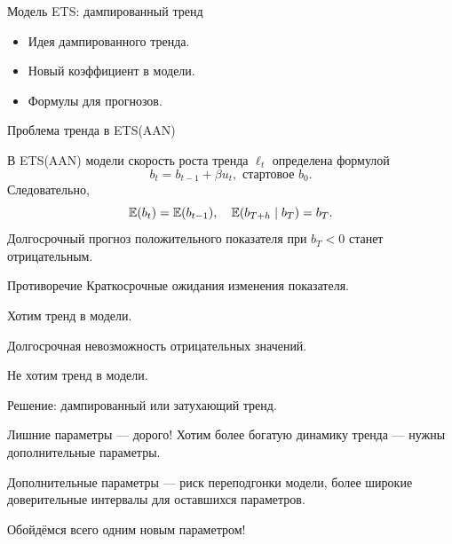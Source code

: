 
\begin{frame} %


\end{frame}



\begin{frame}{Модель ETS: дампированный тренд}
  \begin{itemize}[<+->]
    \item Идея дампированного тренда. 
    \item Новый коэффициент в модели. 
    \item Формулы для прогнозов.
  \end{itemize}

\end{frame}

\begin{frame}{Проблема тренда в ETS(AAN)}

  В ETS(AAN) модели \alert{скорость роста} тренда $\ell_t$ определена формулой
  \[
  b_t = b_{t-1} + \beta u_t, \text{ стартовое } b_0.
  \]
  \pause
  Следовательно,
  \[
  \mathbb{E}(b_t) = \mathbb{E}(b_{t-1}), \quad \mathbb{E}(b_{T+h} \mid b_T) = b_T.
  \]
  \pause
  Долгосрочный прогноз положительного показателя при $b_T < 0$ 
  станет отрицательным. 
\end{frame}

\begin{frame}{Противоречие}
  Краткосрочные ожидания изменения показателя. 

  \alert{Хотим тренд} в модели. 

  \pause
  Долгосрочная невозможность отрицательных значений. 

  \alert{Не хотим тренд} в модели.

  \pause
  Решение: \alert{дампированный} или \alert{затухающий} тренд. 
\end{frame}

\begin{frame}{Лишние параметры — дорого!}
  Хотим более богатую динамику тренда — нужны \alert{дополнительные} параметры. 

  \pause
  Дополнительные параметры — риск \alert{переподгонки} модели, 
  более \alert{широкие доверительные интервалы} для оставшихся параметров. 

  \pause 
  Обойдёмся всего \alert{одним} новым параметром!
\end{frame}

